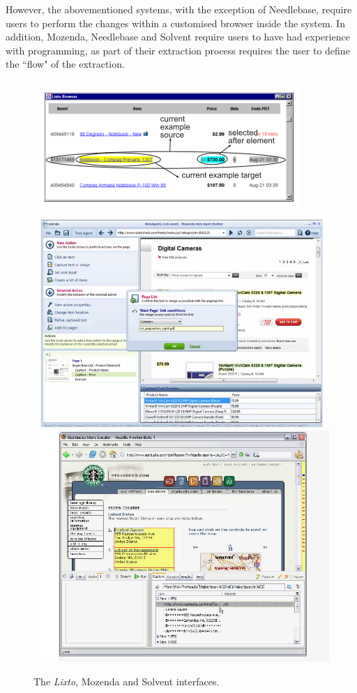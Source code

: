 However, the abovementioned systems, with the exception of Needlebase, require users to perform the changes within a customised browser inside the system. In addition, Mozenda, Needlebase and Solvent require users to have had experience with programming, as part of their extraction process requires the user to define the ``flow" of the extraction.
\begin{figure}[htbp]
\begin{center}
\includegraphics[scale=0.5]{lixto.png} 
\includegraphics[scale=0.25]{mozenda.png}
\\
\includegraphics[scale=0.25]{piggybank.png} 
\end{center}

\caption{The \textit{Lixto}, Mozenda and Solvent interfaces.}
\label{fig:lixto}
\end{figure}

